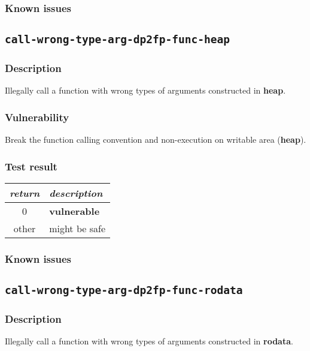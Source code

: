 \documentclass[a4paper]{book}
\begin{document}
\subsubsection{Known issues}

\newpage
\subsection{\texttt{call-wrong-type-arg-dp2fp-func-heap}}\label{test-call-wrong-type-arg-dp2fp-func-heap}

\subsubsection{Description}
Illegally call a function with wrong types of arguments constructed in \textbf{heap}.

\subsubsection{Vulnerability}
Break the function calling convention and non-execution on writable area (\textbf{heap}).

\subsubsection{Test result}
\begin{tabular}{cl}
  \toprule
  \emph{return}  & \emph{description} \\
  \midrule
  0              & \textbf{vulnerable} \\
  other          & might be safe \\
  \bottomrule
\end{tabular}

\subsubsection{Known issues}

\newpage
\subsection{\texttt{call-wrong-type-arg-dp2fp-func-rodata}}\label{test-call-wrong-type-arg-dp2fp-func-rodata}

\subsubsection{Description}
Illegally call a function with wrong types of arguments constructed in \textbf{rodata}.
\end{document}
